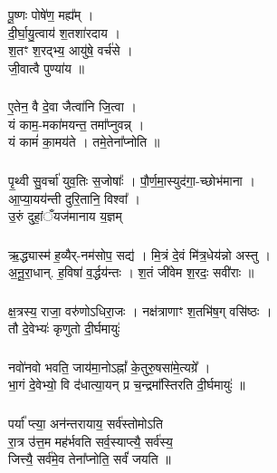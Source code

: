 \subsubsection{}
पू॒ष्णः पोषे॑ण॒ मह्य᳚म् ।\\
दी॒र्घा॒यु॒त्वाय॑ श॒तशा॑रदाय ।\\
श॒तꣳ श॒रद्भ्य॒ आयु॑षे॒ वर्च॑से ।\\
जी॒वात्वै पुण्या॑य ॥\\
\subsubsection{}
ए॒तेन॒ वै दे॒वा जैत्वा॑नि जि॒त्वा ।\\
यं काम॒-मका॑मयन्त॒ तमा᳚प्नुवन्न् ।\\
यं कामं॑ का॒मय॑ते । तमे॒तेना᳚प्नोति ॥\\
\subsubsection{}
पृ॒थ्वी सु॒वर्चा॑ युव॒तिः स॒जोषाः᳚ । पौ॒र्ण॒मा॒स्युद॑गा॒-च्छोभ॑माना ।\\
आ॒प्या॒यय॑न्ती दुरि॒तानि॒ विश्वा᳚ ।\\
उ॒रुं दुहां॒ँयज॑मानाय य॒ज्ञम्\\
\subsubsection{}
ऋ॒द्ध्यास्म॑ ह॒व्यैर्-नम॑सोप॒ सद्य॑ । मि॒त्रं दे॒वं मि॑त्र॒धेय॑न्नो अस्तु ।\\
अ॒नू॒रा॒धान्. ह॒विषा॑ व॒र्द्धय॑न्तः । श॒तं जी॑वेम श॒रदः॒ सवी॑राः ॥\\
\subsubsection{}
क्ष॒त्रस्य॒ राजा॒ वरु॑णोऽधिरा॒जः । नक्ष॑त्राणाꣳ श॒तभि॑ष॒ग् वसि॑ष्ठः ।\\
तौ दे॒वेभ्यः॑ कृणुतो दी॒र्घमायुः॑\\
\subsubsection{}
नवो॑नवो भवति॒ जाय॑मा॒नोऽह्नां᳚ के॒तुरु॒षसा॑मे॒त्यग्रे᳚ ।\\
भा॒गं दे॒वेभ्यो॒ वि द॑धात्या॒यन् प्र च॒न्द्रमा᳚स्तिरति दी॒र्घमायुः॑ ॥\\
\subsubsection{}
पर्या᳚ प्त्या॒ अन॑न्तरायाय॒ सर्व॑स्तोमोऽति \\
रा॒त्र उ॑त्त॒म मह॑र्भवति सर्व॒स्याप्त्यै॒ सर्व॑स्य॒ \\
जित्त्यै॒ सर्व॑मे॒व तेना᳚प्नोति॒ सर्वं॑ जयति ॥\\

